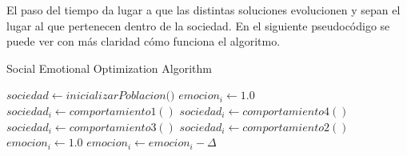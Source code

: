 El paso del tiempo da lugar a que las distintas soluciones evolucionen y sepan el lugar al que pertenecen dentro de la sociedad. En el siguiente pseudocódigo se puede ver con más claridad cómo funciona el algoritmo.

\begin{algorithm}
	\caption{Social Emotional Optimization Algorithm}
	\begin{algorithmic}[1]
		\State $sociedad \gets \textit{inicializarPoblacion()}$
		\State $emocion_i \gets 1.0$
		\State $sociedad_i \gets comportamiento\textit{1}()$
		\State $sociedad_i \gets comportamiento\textit{4}()$
		\State $sociedad_i \gets comportamiento\textit{3}()$
		\Else
		\State $sociedad_i \gets comportamiento\textit{2}()$
		\EndIf
		\State $emocion_i \gets 1.0$
		\Else
		\State $emocion_i \gets emocion_i - \Delta$
		\EndIf
		\EndWhile
	\end{algorithmic}
\end{algorithm}